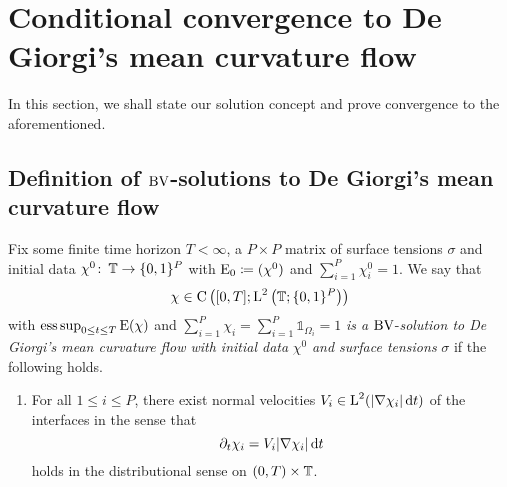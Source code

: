 \section{Conditional convergence to De Giorgi's mean curvature flow}

In this section, we shall state our solution concept and prove convergence to 
the aforementioned.

\subsection{Definition of $ \operatorname{BV} $-solutions to De Giorgi's mean curvature flow}

\begin{definition}
	\label{de_giorgi_solution_to_mmcf}
	Fix some finite time horizon $ T < \infty $, a $ P \times P $ matrix of 
	surface tensions $ \sigma $ and initial data $ \chi^{ 0 } \colon \operatorname{\mathbb{T}} 
	\to \{ 0 , 1 \}^{ P } $ with $ \operatorname{E}_{ 0 } \coloneqq ( \chi^{ 0 } ) $ and 
	$ \sum_{ i = 1 }^{ P } \chi_{ i }^{ 0 } = 1 $. We say that
	\begin{equation*}
		\chi \in \operatorname{C} \left(
		[ 0 , T ]
		;
		\operatorname{L}^{ 2 } \left( \operatorname{\mathbb{T}} ; \{ 0 , 1 \}^{ P } \right)
		\right)
	\end{equation*}
	with $ \operatorname*{ess\,sup}_{ 0 \leq t \leq T } \operatorname{E} ( \chi ) $ and $ \sum_{ i = 1 
	}^{ P } \chi_{ i } = \sum_{ i = 1 }^{ P } \mathds{ 1 }_{ \Omega_{ i } } = 
	1  $ \emph{is a } $\operatorname{BV}$-\emph{solution to De Giorgi's mean 
	curvature flow with initial data} $ \chi^{ 0 } $ \emph{and surface 
	tensions} $ \sigma $ if the following holds. 
	\begin{enumerate}
		\item 
		For all $ 1 \leq i \leq P $, there exist normal 
		velocities $ V_{ i } \in \operatorname{L}^{ 2 } ( \abs{ \nabla \chi_{ i } } \dd{ t } 
		) $ 
		of the interfaces 
		in the sense that
		\begin{equation*}
			\partial_{ t } \chi_{ i }
			=
			V_{ i } \abs{ \nabla \chi_{ i } } \dd{ t }
		\end{equation*}
		holds in the distributional sense on $ ( 0 , T ) \times \operatorname{\mathbb{T}} $.
		

\end{enumerate}
\end{definition}
